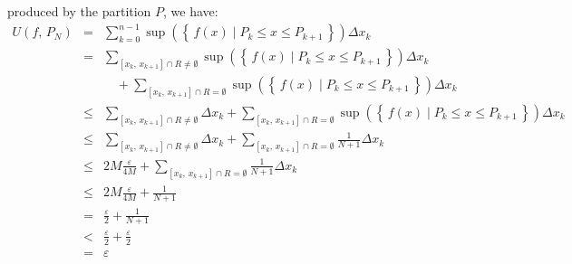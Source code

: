 \documentclass{article}
\theoremstyle{normal}
\begin{document}
            produced by the partition $P$, we have:
            \begin{equation}
                \begin{array}{rcl}
                    \displaystyle
                    U(f,\,P_{N})
                    &=&
                    \displaystyle
                    \sum_{k=0}^{n-1}
                        \sup\left(
                            \left\{\,
                                f(x)\;\big|\;P_{k}\leq{x}\leq{P}_{k+1}\,
                            \right\}
                        \right)
                        \Delta{x}_{k}\\[1.5em]
                    &=&
                    \displaystyle
                    \sum_{[x_{k},\,x_{k+1}]\cap{R}\ne\emptyset}
                        \sup\left(
                            \left\{\,
                                f(x)\;\big|\;P_{k}\leq{x}\leq{P}_{k+1}\,
                            \right\}
                        \right)
                        \Delta{x}_{k}\\[1.5em]
                    &&
                    \displaystyle
                    \quad
                    +\sum_{[x_{k},\,x_{k+1}]\cap{R}=\emptyset}
                        \sup\left(
                            \left\{\,
                                f(x)\;\big|\;P_{k}\leq{x}\leq{P}_{k+1}\,
                            \right\}
                        \right)
                        \Delta{x}_{k}\\[1.5em]
                    &\leq&
                    \displaystyle
                    \sum_{[x_{k},\,x_{k+1}]\cap{R}\ne\emptyset}
                        \Delta{x}_{k}
                    +\sum_{[x_{k},\,x_{k+1}]\cap{R}=\emptyset}
                        \sup\left(
                            \left\{\,
                                f(x)\;\big|\;P_{k}\leq{x}\leq{P}_{k+1}\,
                            \right\}
                        \right)
                        \Delta{x}_{k}\\[1.5em]
                    &\leq&
                    \displaystyle
                    \sum_{[x_{k},\,x_{k+1}]\cap{R}\ne\emptyset}
                        \Delta{x}_{k}
                    +\sum_{[x_{k},\,x_{k+1}]\cap{R}=\emptyset}
                        \frac{1}{N+1}
                        \Delta{x}_{k}\\[1.5em]
                    &\leq&
                    \displaystyle
                    2M\frac{\varepsilon}{4M}
                    +\sum_{[x_{k},\,x_{k+1}]\cap{R}=\emptyset}
                        \frac{1}{N+1}
                        \Delta{x}_{k}\\[1.5em]
                    &\leq&
                    \displaystyle
                    2M\frac{\varepsilon}{4M}+\frac{1}{N+1}\\[1.5em]
                    &=&
                    \displaystyle
                    \frac{\varepsilon}{2}+\frac{1}{N+1}\\[1.5em]
                    &<&
                    \frac{\varepsilon}{2}+\frac{\varepsilon}{2}\\[1.5em]
                    &=&
                    \displaystyle
                    \varepsilon
                \end{array}
            \end{equation}
\end{document}
